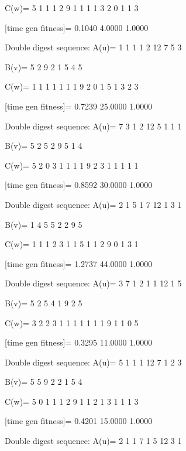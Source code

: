 C(w)=
     5     1     1     1     2     9     1     1     1     1     3     2     0     1     1     3

[time gen fitness]=
    0.1040    4.0000    1.0000

Double digest sequence:
A(u)=
     1     1     1     1     2    12     7     5     3

B(v)=
     5     2     9     2     1     5     4     5

C(w)=
     1     1     1     1     1     1     1     9     2     0     1     5     1     3     2     3

[time gen fitness]=
    0.7239   25.0000    1.0000

Double digest sequence:
A(u)=
     7     3     1     2    12     5     1     1     1

B(v)=
     5     2     5     2     9     5     1     4

C(w)=
     5     2     0     3     1     1     1     1     9     2     3     1     1     1     1     1

[time gen fitness]=
    0.8592   30.0000    1.0000

Double digest sequence:
A(u)=
     2     1     5     1     7    12     1     3     1

B(v)=
     1     4     5     5     2     2     9     5

C(w)=
     1     1     1     2     3     1     1     5     1     1     2     9     0     1     3     1

[time gen fitness]=
    1.2737   44.0000    1.0000

Double digest sequence:
A(u)=
     3     7     1     2     1     1    12     1     5

B(v)=
     5     2     5     4     1     9     2     5

C(w)=
     3     2     2     3     1     1     1     1     1     1     1     9     1     1     0     5

[time gen fitness]=
    0.3295   11.0000    1.0000

Double digest sequence:
A(u)=
     5     1     1     1    12     7     1     2     3

B(v)=
     5     5     9     2     2     1     5     4

C(w)=
     5     0     1     1     1     2     9     1     1     2     1     3     1     1     1     3

[time gen fitness]=
    0.4201   15.0000    1.0000

Double digest sequence:
A(u)=
     2     1     1     7     1     5    12     3     1

